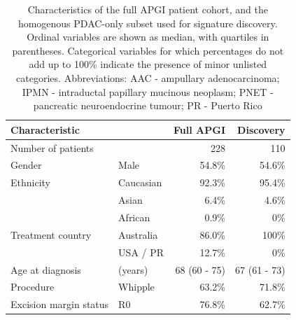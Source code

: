 \documentclass[dissertation.tex]{subfiles}
\begin{document}
\begin{table}[h]
\centering
\caption[Characteristics of the \acrshort{APGI} patient cohorts]{Characteristics of the full \gls{APGI} patient cohort, and the homogenous \gls{PDAC}-only subset used for signature discovery.  Ordinal variables are shown as median, with quartiles in parentheses.  Categorical variables for which percentages do not add up to 100\% indicate the presence of minor unlisted categories.  Abbreviations: AAC - ampullary adenocarcinoma; IPMN - intraductal papillary mucinous neoplasm; PNET - pancreatic neuroendocrine tumour; PR - Puerto Rico}\label{tab:sigs-cohort-characteristics}
\begin{tabular}{@{}llrr@{}}
\toprule
Characteristic             &                          & Full \gls{APGI} & Discovery \\ \midrule
Number of patients         &                          & 228                      & 110                                                    \\
Gender                     & Male                     & 54.8\%                   & 54.6\%                                                 \\
Ethnicity                  & Caucasian                & 92.3\%                   & 95.4\%                                                 \\
                           & Asian                    & 6.4\%                    & 4.6\%                                                  \\
                           & African                  & 0.9\%                    & 0\%                                                    \\
Treatment country          & Australia                & 86.0\%                   & 100\%                                                  \\
                           & USA / PR        & 12.7\%                   & 0\%                                                    \\
Age at diagnosis           & (years)                  & 68 (60 - 75)               & 67 (61 - 73)                                             \\
Procedure                  & Whipple                  & 63.2\%                   & 71.8\%                                                 \\
Excision margin status     & R0                       & 76.8\%                   & 62.7\%                                                 \\

\end{tabular}
\end{table}
\end{document}
